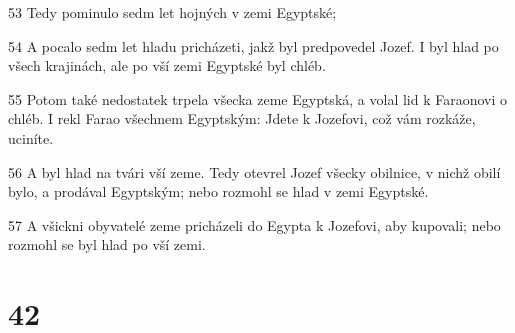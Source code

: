 \par 53 Tedy pominulo sedm let hojných v zemi Egyptské;
\par 54 A pocalo sedm let hladu pricházeti, jakž byl predpovedel Jozef. I byl hlad po všech krajinách, ale po vší zemi Egyptské byl chléb.
\par 55 Potom také nedostatek trpela všecka zeme Egyptská, a volal lid k Faraonovi o chléb. I rekl Farao všechnem Egyptským: Jdete k Jozefovi, což vám rozkáže, uciníte.
\par 56 A byl hlad na tvári vší zeme. Tedy otevrel Jozef všecky obilnice, v nichž obilí bylo, a prodával Egyptským; nebo rozmohl se hlad v zemi Egyptské.
\par 57 A všickni obyvatelé zeme pricházeli do Egypta k Jozefovi, aby kupovali; nebo rozmohl se byl hlad po vší zemi.

\chapter{42}

